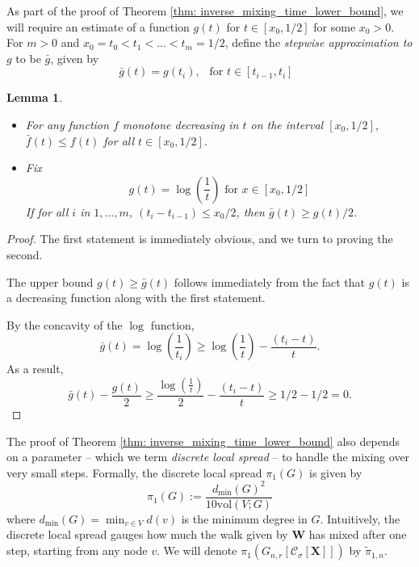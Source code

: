 \documentclass{article}
\newcommand{\vol}{\mathrm{vol}}
\newcommand{\1}{\mathbf{1}}
\newcommand{\Xbf}{\mathbf{X}}
\newcommand{\Wbf}{\mathbf{W}}
\newcommand{\Cset}{\mathcal{C}}
\newcommand{\Csig}{\Cset_{\sigma}}
\theoremstyle{aldenthm}
\newtheorem{lemma}{Lemma}
\begin{document}
As part of the proof of Theorem \ref{thm: inverse_mixing_time_lower_bound}, we will require an estimate of a function $g(t)$ for $t \in [x_0, 1/2]$ for some $x_0 > 0$. For $m > 0$ and $x_0 = t_0 < t_1 < \ldots < t_m = 1/2$, define the \emph{stepwise approximation to $g$} to be $\bar{g}$, given by 
\begin{equation}
\label{eqn: stepwise_approximation}
\bar{g}(t) = g(t_i), ~~ \text{ for $t \in [t_{i-1}, t_i]$ }
\end{equation}
\begin{lemma}
	\label{lem: stepwise_approximation}
	\begin{itemize}
		\item For any function $f$ monotone decreasing in $t$ on the interval $[x_0,1/2]$, $\bar{f}(t) \leq f(t)$ for all $t \in [x_0,1/2]$.
		\item Fix
		\begin{equation*}
		g(t) = \log\left(\frac{1}{t}\right) \text{ for $x \in [x_0, 1/2]$}
		\end{equation*}
		If for all $i$ in $1,\ldots,m$, $(t_i - t_{i - 1}) \leq x_0/2$, then $\bar{g}(t)\geq g(t) / 2$.
	\end{itemize}
	
	
\end{lemma}
\begin{proof}
	The first statement is immediately obvious, and we turn to proving the second. 
	
	The upper bound $g(t) \geq \bar{g}(t)$ follows immediately from the fact that $g(t)$ is a decreasing function along with the first statement.
	
	By the concavity of the $\log$ function, 
	\begin{equation*}
	\bar{g}(t) = \log\left(\frac{1}{t_i}\right) \geq \log\left(\frac{1}{t}\right) - \frac{(t_i - t)}{t}.
	\end{equation*}
	As a result,
	\begin{equation*}
	\bar{g}(t) - \frac{g(t)}{2} \geq \frac{\log\left(\frac{1}{t}\right)}{2} - \frac{(t_i - t)}{t} \geq 1/2 - 1/2 = 0.
	\end{equation*}
\end{proof}

The proof of Theorem \ref{thm: inverse_mixing_time_lower_bound} also depends on a parameter -- which we term \emph{discrete local spread} -- to handle the mixing over very small steps. Formally, the discrete local spread $\pi_1(G)$ is given by
\begin{equation}
\label{eqn: local_spread}
\pi_1(G) := \frac{d_{\min}(G)^2}{10 \vol(V; G)} 
\end{equation}
where $d_{\min}(G) = \min_{v \in V} d(v)$ is the minimum degree in $G$. Intuitively, the discrete local spread gauges how much the walk given by $\Wbf$ has mixed after one step, starting from any node $v$. We will denote $\pi_1(G_{n,r}[\Csig[\Xbf]])$ by $\widetilde{\pi}_{1,n}$. 
\end{document}
